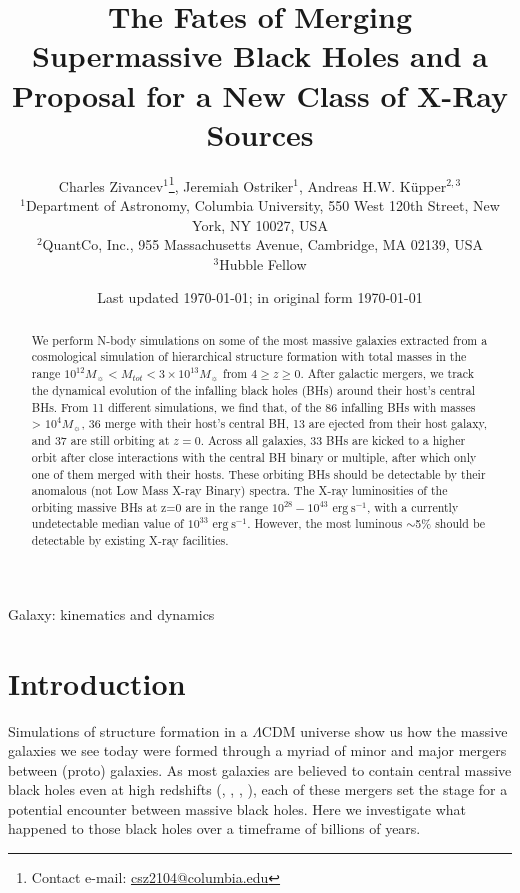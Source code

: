 \documentclass[fleqn,usenatbib,useAMS]{mnras}
\title[MNRAS]{The Fates of Merging Supermassive Black Holes and a Proposal for a New Class of X-Ray Sources}
\author[]{
Charles Zivancev$^{1}$\thanks{Contact e-mail: \href{mailto:csz2104@columbia.edu}{csz2104@columbia.edu}},
Jeremiah Ostriker$^{1}$,
Andreas H.W. K\"upper$^{2,3}$
\\
$^{1}$Department of Astronomy, Columbia University, 550 West 120th Street, New York, NY 10027, USA\\
$^{2}$QuantCo, Inc., 955 Massachusetts Avenue, Cambridge, MA 02139, USA\\
$^{3}$Hubble Fellow\\
}
\date{Last updated \today; in original form \today}
\begin{document}
\label{firstpage}
\pagerange{\pageref{firstpage}--\pageref{lastpage}}
\maketitle



\begin{abstract}
We perform N-body simulations on some of the most massive galaxies extracted from a cosmological simulation of hierarchical structure formation with total masses in the range $10^{12} M_{\sun} < M_{tot} < 3\times 10^{13} M_{\sun}$ from $4\geq z \geq 0$.  After galactic mergers, we track the dynamical evolution of the infalling black holes (BHs) around their host's central BHs.  From 11 different simulations, we find that, of the 86 infalling BHs with masses > $10^4 M_{\sun}$, 36 merge with their host's central BH, 13 are ejected from their host galaxy, and 37 are still orbiting at $z=0$.  Across all galaxies, 33 BHs are kicked to a higher orbit after close interactions with the central BH binary or multiple, after which only one of them merged with their hosts.  These orbiting BHs should be detectable by their anomalous (not Low Mass X-ray Binary) spectra.  The X-ray luminosities of the orbiting massive BHs at z=0 are in the range $10^{28}-10^{43}$ $\mathrm{erg}~\mathrm{s}^{-1}$, with a currently undetectable median value of $10^{33}$ $\mathrm{erg}~\mathrm{s}^{-1}$.  However, the most luminous $\sim$5\% should be detectable by existing X-ray facilities.
\end{abstract}


\begin{keywords}
Galaxy: kinematics and dynamics
\end{keywords}




\section{Introduction}\label{sec:introduction}
Simulations of structure formation in a $\Lambda$CDM universe show us how the massive galaxies we see today were formed through a myriad of minor and major mergers between (proto) galaxies. As most galaxies are believed to contain central massive black holes even at high redshifts (\citet{1998AJ....115.2285M}, \citet{2003ApJ...589L..21M}, \citet{2004ApJ...604L..89H}, \citet{2013ARA&A..51..511K}), each of these mergers set the stage for a potential encounter between massive black holes. Here we investigate what happened to those black holes over a timeframe of billions of years.
\end{document}
